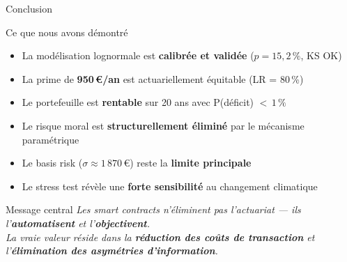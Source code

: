 \documentclass[aspectratio=169, 10pt, t]{beamer}
\newcommand{\euro}{€}
\newcommand{\good}[1]{\textcolor{SuccessGreen}{\faCheckCircle\ #1}}
\newcommand{\warn}[1]{\textcolor{WarnOrange}{\faExclamationTriangle\ #1}}
\begin{document}
\begin{frame}{Conclusion}
  \begin{block}{Ce que nous avons démontré}
    \begin{itemize}
      \setlength{\itemsep}{4pt}
      \item[\good{}] La modélisation lognormale est \textbf{calibrée et validée} ($p = 15{,}2\,\%$, KS OK)
      \item[\good{}] La prime de \textbf{950\,\euro/an} est actuariellement équitable (LR = 80\,\%)
      \item[\good{}] Le portefeuille est \textbf{rentable} sur 20 ans avec P(déficit) $<\,1\,\%$
      \item[\good{}] Le risque moral est \textbf{structurellement éliminé} par le mécanisme paramétrique
      \item[\warn{}] Le basis risk ($\sigma \approx 1\,870$\,\euro) reste la \textbf{limite principale}
      \item[\warn{}] Le stress test révèle une \textbf{forte sensibilité} au changement climatique
    \end{itemize}
  \end{block}

  \begin{exampleblock}{Message central}
    \centering
    \textit{Les smart contracts n'éliminent pas l'actuariat ---
    ils l'\textbf{automatisent} et l'\textbf{objectivent}.\\[3pt]
    La vraie valeur réside dans la \textbf{réduction des coûts de transaction}
    et l'\textbf{élimination des asymétries d'information}.}
  \end{exampleblock}
\end{frame}
\end{document}
